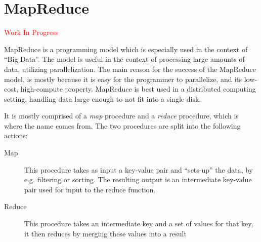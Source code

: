 \section{MapReduce} %
\label{sec:mapreduce_programming_model}
\textcolor{red}{Work In Progress}

MapReduce is a programming model which is especially used in the context of ``Big Data''. The model is useful in the context of processing large amounts of data, utilizing parallelization. The main reason for the success of the MapReduce model, is mostly because it is easy for the programmer to parallelize, and its low-cost, high-compute property. MapReduce is best used in a distributed computing setting, handling data large enough to not fit into a single disk.

It is mostly comprised of a \emph{map} procedure and a \emph{reduce} procedure, which is where the name comes from. The two procedures are split into the following actions:


\begin{description}
    \item[Map] This procedure takes as input a key-value pair and ``sets-up'' the data, by e.g. filtering or sorting. The resulting output is an intermediate key-value pair used for input to the reduce function.
    \item[Reduce] This procedure takes an intermediate key and a set of values for that key, it then reduces by merging these values into a result
\end{description}

